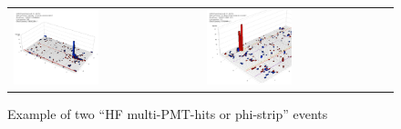 %
\begin{figure}[h]
 \centering
 \begin{tabular}{ll}
   \includegraphics[width=0.47\textwidth]{fig/HFmultiHits.png} &
   \includegraphics[width=0.47\textwidth]{fig/HFmultiHits_2.png} \\
 \end{tabular}
\caption{Example of two ``HF multi-PMT-hits or phi-strip'' events}
\label{fig:HFmultiHits}
\end{figure}

